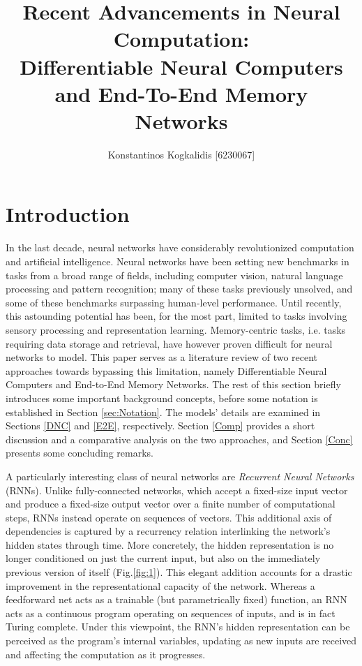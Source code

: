 \documentclass[]{article}
\begin{document}
\author{Konstantinos Kogkalidis [6230067]}
\title{Recent Advancements in Neural Computation: \\
\large Differentiable Neural Computers and End-To-End Memory Networks}
\maketitle

\section{Introduction}
In the last decade, neural networks have considerably revolutionized computation and artificial intelligence. Neural networks have been setting new benchmarks in tasks from a broad range of fields, including computer vision, natural language processing and pattern recognition; many of these tasks previously unsolved, and some of these benchmarks surpassing human-level performance. Until recently, this astounding potential has been, for the most part, limited to tasks involving sensory processing and representation learning. Memory-centric tasks, i.e. tasks requiring data storage and retrieval, have however proven difficult for neural networks to model. This paper serves as a literature review of two recent approaches towards bypassing this limitation, namely Differentiable Neural Computers\cite{Graves2016} and End-to-End Memory Networks\cite{NIPS2015_5846}. The rest of this section briefly introduces some important background concepts, before some notation is established in Section \ref{sec:Notation}. The models' details are examined in Sections \ref{DNC} and \ref{E2E}, respectively. Section \ref{Comp} provides a short discussion and a comparative analysis on the two approaches, and Section \ref{Conc} presents some concluding remarks.

A particularly interesting class of neural networks are \textit{Recurrent Neural Networks} (RNNs). Unlike fully-connected networks, which accept a fixed-size input vector and produce a fixed-size output vector over a finite number of computational steps, RNNs instead operate on sequences of vectors. This additional axis of dependencies is captured by a recurrency relation interlinking the network's hidden states through time. More concretely, the hidden representation is no longer conditioned on just the current input, but also on the immediately previous version of itself (Fig.\ref{fig:1}). This elegant addition accounts for a drastic improvement in the representational capacity of the network. Whereas a feedforward net acts as a trainable (but parametrically fixed) function, an RNN acts as a continuous program operating on sequences of inputs, and is in fact Turing complete\cite{Siegelmann545}. Under this viewpoint, the RNN's hidden representation can be perceived as the program's internal variables, updating as new inputs are received and affecting the computation as it progresses.
\end{document}
